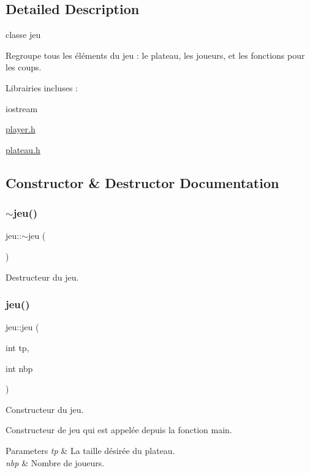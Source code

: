 \subsection{Detailed Description}
classe jeu 

Regroupe tous les éléments du jeu \+: le plateau, les joueurs, et les fonctions pour les coups.

Librairies incluses \+:
\begin{DoxyItemize}
\item iostream
\item \hyperlink{player_8h}{player.\+h}
\item \hyperlink{plateau_8h}{plateau.\+h} 
\end{DoxyItemize}

\subsection{Constructor \& Destructor Documentation}
\mbox{\label{classjeu_a55385a33ef40e0579eb3a3634566c4a8}} 
\subsubsection{\texorpdfstring{$\sim$jeu()}{~jeu()}}
{\footnotesize\ttfamily jeu\+::$\sim$jeu (\begin{DoxyParamCaption}{ }\end{DoxyParamCaption})}



Destructeur du jeu. 

\mbox{\label{classjeu_abc0e1ad9a05d57a06de111e9ccb3f8b9}} 
\subsubsection{\texorpdfstring{jeu()}{jeu()}}
{\footnotesize\ttfamily jeu\+::jeu (\begin{DoxyParamCaption}\item[{int}]{tp,  }\item[{int}]{nbp }\end{DoxyParamCaption})}



Constructeur du jeu. 

Constructeur de jeu qui est appelée depuis la fonction main. 
\begin{DoxyParams}{Parameters}
{\em tp} & La taille désirée du plateau. \\
\hline
{\em nbp} & Nombre de joueurs. \\
\hline
\end{DoxyParams}


